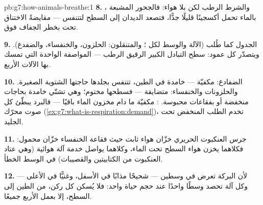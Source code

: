 \begin{solution}{pb:g7:how-animals-breathe:1}
\textbf{8.} ، والشرط الرطب لكن بلا هواء: فالجحور
المشبعة بالماء تحمل أكسجينًا قليلًا جدًّا، فتصعد الديدان إلى السطح
لتتنفس --- مقايضةً الاختناق تحت بخطر الجفاف فوق.

\textbf{9.} الجدول كما طُلب (الآلة والوسط لكل ؛ والمتنقلون:
الحلزون، والخنفساء، والضفدع). ويتصدّر كل عمود: سطح التبادل الكبير
الرقيق الرطب --- المواصفة الواحدة التي تمسك بها الآلات الأربع.

\textbf{10.} الضفادع: مكفيّة --- خامدة في الطين، تتنفس بجلدها
حاجتها الشتوية الصغيرة. والحلزونات والخنفساء: متضايقة --- فسطحها
مختوم؛ وهي تشتّي خامدة بحاجات منخفضة أو بفقاعات محبوسة. :
مكفيّة ما دام مخزون الماء باقيًا --- فالبرد يبطّئ كل صوت محرّك
(\cref{ex:g7:what-is-respiration:demand})،  تخدم الطلب
المنخفض تحت الجليد.

\textbf{11.} جرس العنكبوت الحريري خزّان هواء ثابت حيث فقاعة
الخنفساء خزّان محمول: فكلاهما يخزن هواء السطح تحت الماء، وكلاهما
يواصل خدمة آلة هوائية (وهي عتاد العنكبوت من  الكتابيتين
والقصيبات) في الوسط الخطأ.

\textbf{12.} لأن البركة تعرض  في وسطين --- شحيحًا مذابًا
في الأسفل، وغنيًّا في الأعلى --- وكل آلة تحصد وسطًا واحدًا عند حجم
حياة واحد: فلا يُسكن كل ركن، من الطين إلى  السطح، إلا بعمل
الأربع جميعًا.
\end{solution}
